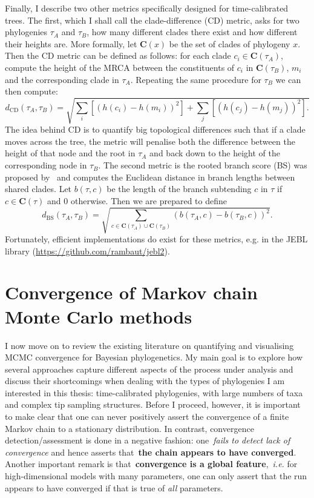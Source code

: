 Finally, I describe two other metrics specifically designed for time-calibrated trees.
The first, which I shall call the clade-difference (CD) metric, asks for two phylogenies $\tau_A$ and $\tau_B$, how many different clades there exist and how different their heights are.
More formally, let $\boldsymbol C(x)$ be the set of clades of phylogeny $x$.
Then the CD metric can be defined as follows: for each clade $c_i \in \boldsymbol C(\tau_A)$, compute the height of the MRCA between the constituents of $c_i$ in $\boldsymbol C(\tau_B)$, $m_i$ and the corresponding clade in $\tau_A$.
Repeating the same procedure for $\tau_B$ we can then compute:
$$ d_{\text{CD}} (\tau_A, \tau_B) = \sqrt{  \sum_i\left[ \left(h(c_i) - h(m_i) \right)^2 \right]  + \sum_j \left[ \left(h(c_j) - h(m_j)\right)^2 \right].  } $$
The idea behind CD is to quantify big topological differences such that  if a clade moves  across the tree, the metric will penalise both the difference between the height of that node and the root in $\tau_A$ and back down to the height of the corresponding node in $\tau_B$.
The second metric is the rooted branch score (BS) was proposed by~\cite{Heled2010} and computes the Euclidean distance in branch lengths between shared clades.
Let $b(\tau, c)$ be the length of the branch subtending $c$ in $\tau$ if $c \in \boldsymbol C(\tau)$ and $0$ otherwise.
Then we are prepared to define
$$d_{\text{BS}}(\tau_A, \tau_B) = \sqrt{ \sum_{c \in \boldsymbol C(\tau_A) \cup \boldsymbol C(\tau_B) } \left( b(\tau_A, c) - b(\tau_B, c) \right)^2 }  .$$
Fortunately, efficient implementations do exist for these metrics, e.g. in the JEBL library (\url{https://github.com/rambaut/jebl2}).

\section{Convergence of Markov chain Monte Carlo methods} %
\label{sec:litrev}

I now move on to review the existing literature on quantifying and visualising MCMC convergence for Bayesian phylogenetics.
My main goal is to explore how several approaches capture different aspects of the process under analysis and discuss their shortcomings when dealing with the types of phylogenies I am interested in this thesis: time-calibrated phylogenies, with large numbers of taxa and complex tip sampling structures.
Before I proceed, however, it is important to make clear that one can never positively assert the convergence of a finite Markov chain to a stationary distribution.
In contrast, convergence detection/assessment is done in a negative fashion: one~\textit{fails to detect lack of convergence} and hence asserts that~\textbf{the chain appears to have converged}.
Another important remark is that~\textbf{convergence is a global feature},~\textit{i.e.} for high-dimensional models with many parameters, one can only assert that the run appears to have converged if that is true of \textit{all} parameters.


